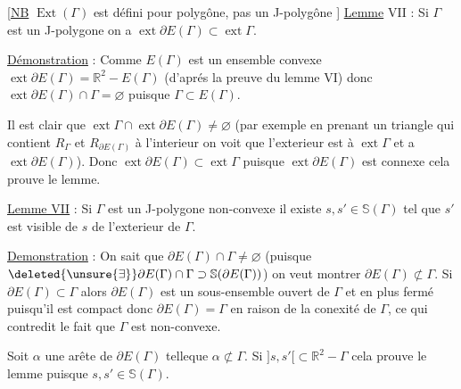 [\uline{NB} $\operatorname{Ext}(\Gamma)$ est défini pour  polygône, pas  un J-polygône ]
\uline{Lemme} VII : Si $\Gamma$ est un J-polygone on a $\operatorname{ext}\partial E(\Gamma)\subset\operatorname{ext}\Gamma$.

\uline{Démonstration} : Comme $E(\Gamma)$ est un ensemble convexe $\operatorname{ext}\partial E(\Gamma)=\mathbb{R}^{2}-E(\Gamma)$ (d'aprés la preuve du lemme VI) donc $\operatorname{ext}\partial E(\Gamma)\cap\Gamma=\varnothing$ puisque $\Gamma\subset E(\Gamma)$.

Il est clair que $\operatorname{ext}\Gamma\cap\operatorname{ext}\partial E(\Gamma)\ne\varnothing$ (par exemple en prenant un triangle qui contient $R_{\Gamma}$ et $R_{\partial E(\Gamma)}$ à l'interieur on voit que l'exterieur est  à  $\operatorname{ext}\Gamma$ et a $\operatorname{ext}\partial E(\Gamma)$). Donc $\operatorname{ext}\partial E(\Gamma)\subset\operatorname{ext}\Gamma$ puisque $\operatorname{ext}\partial E(\Gamma)$ est connexe  cela prouve le lemme.

\uline{Lemme VII} : Si $\Gamma$ est un \inserted{(}J-\inserted{)}polygone non-convexe il existe $s,s'\in\mathbb{S}(\Gamma)$ tel que  $s'$ est visible de $s$ de l'exterieur de $\Gamma$.

\uline{Demonstration} : On sait que $\partial E(\Gamma)\cap\Gamma\ne\varnothing$ (puisque $\deleted{\unsure{\exists}}\partial E(\Gamma)\cap\Gamma\supset\mathbb{S}(\partial E(\Gamma))$) on veut montrer  $\partial E(\Gamma)\not\subset\Gamma$. Si $\partial E(\Gamma)\subset\Gamma$ alors  $\partial E(\Gamma)$ est un sous-ensemble ouvert de $\Gamma$ et en plus fermé puisqu'il est compact donc $\partial E(\Gamma)=\Gamma$ en raison de la conexité de $\Gamma$, ce qui contredit le fait que $\Gamma$ est non-convexe.

Soit $\alpha$\inserted{$=[s,s']$} une arête de $\partial E(\Gamma)$ telleque $\alpha\not\subset\Gamma$. Si $]s,s'[\subset\mathbb{R}^{2}-\Gamma$ cela prouve le lemme puisque $s,s'\in\mathbb{S}(\Gamma)$.

